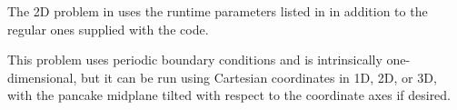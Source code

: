 The 2D  problem in \flashx uses the 
runtime parameters listed in  
in addition to the regular ones supplied with the code. 


This problem uses
periodic boundary conditions and is intrinsically one-dimensional,
but it can be run using Cartesian coordinates in 1D, 2D, or 3D, with
the pancake midplane tilted with respect to the coordinate axes if
desired.


